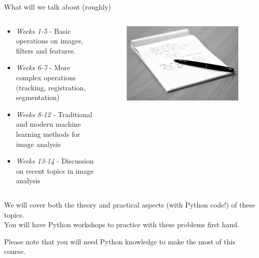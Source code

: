 \documentclass[9pt, aspectratio=169]{beamer}
\begin{document}
\begin{frame}
    {What will we talk about (roughly)}
    \begin{columns}
        \begin{column}{0.7\textwidth}
            \begin{itemize}
                \item \textit{Weeks 1-5} - Basic operations on images, filters and features.
                \item \textit{Weeks 6-7} - More complex operations (tracking, registration, segmentation)
                \item \textit{Weeks 8-12} - Traditional and modern machine learning methods for image analysis
                \item \textit{Weeks 13-14} - Discussion on recent topics in image analysis
            \end{itemize}
        \end{column}
        \begin{column}{0.3\textwidth}
            \begin{figure}
                \includegraphics[width=\textwidth]{notes.jpg}
                \caption{\color{gray}{Matt Cornock - CC BY-NC 2.0}}
            \end{figure}
        \end{column}
    \end{columns}
    \pause

    We will cover both the theory and practical aspects (with Python code!) of these topics.\\
    You will have Python workshops to practice with these problems first hand.

    \pause

    Please note that you will need Python knowledge to make the most of this course.
\end{frame}
\end{document}
